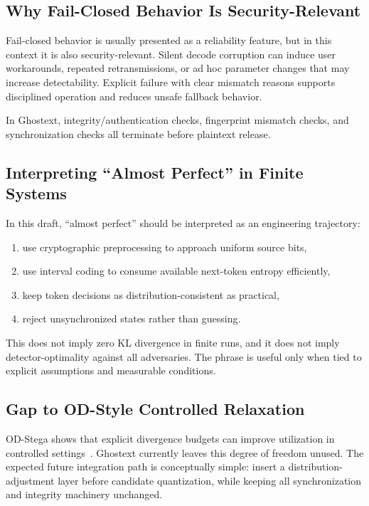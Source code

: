 \subsection{Why Fail-Closed Behavior Is Security-Relevant}

Fail-closed behavior is usually presented as a reliability feature, but in this context it is also security-relevant. Silent decode corruption can induce user workarounds, repeated retransmissions, or ad hoc parameter changes that may increase detectability. Explicit failure with clear mismatch reasons supports disciplined operation and reduces unsafe fallback behavior.

In Ghostext, integrity/authentication checks, fingerprint mismatch checks, and synchronization checks all terminate before plaintext release.

\subsection{Interpreting ``Almost Perfect'' in Finite Systems}

In this draft, ``almost perfect'' should be interpreted as an engineering trajectory:

\begin{enumerate}
\item use cryptographic preprocessing to approach uniform source bits,
\item use interval coding to consume available next-token entropy efficiently,
\item keep token decisions as distribution-consistent as practical,
\item reject unsynchronized states rather than guessing.
\end{enumerate}

This does not imply zero KL divergence in finite runs, and it does not imply detector-optimality against all adversaries. The phrase is useful only when tied to explicit assumptions and measurable conditions.

\subsection{Gap to OD-Style Controlled Relaxation}

OD-Stega shows that explicit divergence budgets can improve utilization in controlled settings~\cite{huang2026odstega}. Ghostext currently leaves this degree of freedom unused. The expected future integration path is conceptually simple: insert a distribution-adjustment layer before candidate quantization, while keeping all synchronization and integrity machinery unchanged.

